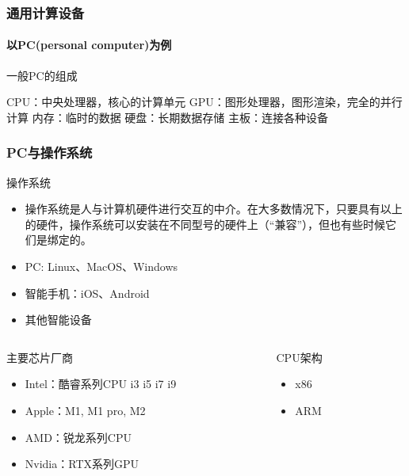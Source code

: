 \documentclass[10pt]{beamer}
\begin{document}
\begin{frame}
\frametitle{通用计算设备}
\framesubtitle{以PC(personal computer)为例}

\begin{block}{一般PC的组成}
    \begin{outline}
        \1 CPU：中央处理器，核心的计算单元
        \1 GPU：图形处理器，图形渲染，完全的并行计算
        \1 内存：临时的数据
        \1 硬盘：长期数据存储
        \1 主板：连接各种设备
    \end{outline}
\end{block}

\end{frame}

\begin{frame}
\frametitle{PC与操作系统}
\begin{block}{操作系统}
    \begin{itemize}
        \item 操作系统是人与计算机硬件进行交互的中介。在大多数情况下，只要具有以上的硬件，操作系统可以安装在不同型号的硬件上（“兼容”），但也有些时候它们是绑定的。
        \item PC: Linux、MacOS、Windows
        \item 智能手机：iOS、Android
        \item 其他智能设备
    \end{itemize}
\end{block}

\begin{columns}
    \begin{column}{0.7\textwidth}
        \begin{block}{主要芯片厂商}
            \begin{itemize}
                \item Intel：酷睿系列CPU i3 i5 i7 i9
                \item Apple：M1, M1 pro, M2
                \item AMD：锐龙系列CPU
                \item Nvidia：RTX系列GPU
            \end{itemize}
        \end{block}
    \end{column}
    \begin{column}{0.3\textwidth}
        \begin{block}{CPU架构}
            \begin{itemize}
                
                \item x86
                \item ARM
            \end{itemize}
        \end{block}
    \end{column}
\end{columns}

\end{frame}
\end{document}
